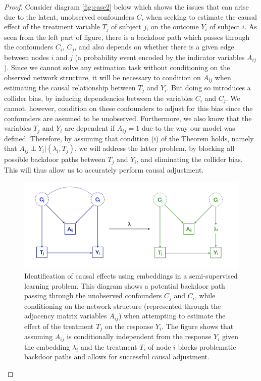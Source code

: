 \documentclass{article}
\begin{document}
\begin{proof}
Consider diagram \ref{fig:case2} below which shows the issues that can arise due to the latent, unobserved confounders $C$, when seeking to estimate the causal effect of the treatment variable $T_j$ of subject $j$, on the outcome $Y_i$ of subject $i$. As seen from the left part of figure, there is a backdoor path which passes through the confounders $C_i$, $C_j$, and also depends on whether there is a given edge between nodes $i$ and $j$ (a probability event encoded by the indicator variables $A_{ij}$). Since we cannot solve any estimation task without conditioning on the observed network structure, it will be necessary to condition on $A_{ij}$ when estimating the causal relationship between $T_j$ and $Y_i$. But doing so introduces a collider bias, by inducing dependencies between the variables $C_i$ and $C_j$. We cannot, however, condition on these confounders to adjust for this bias since the confounders are assumed to be unobserved. Furthermore, we also know that the variables $T_j$ and $Y_i$ are dependent if $A_{ij} =1$ due to the way our model was defined. Therefore, by assuming that condition (i) of the Theorem holds, namely that $A_{ij} \perp Y_i | (\lambda_i, T_j)$, we will address the latter problem, by blocking all possible backdoor paths between $T_j$ and $Y_i$, and eliminating the collider bias. This will thus allow us to accurately perform causal adjustment. 



\begin{figure}
  \includegraphics[width=\linewidth]{case1.png}
  \caption{Identification of causal effects using embeddings in a semi-supervised learning problem. This diagram shows a potential backdoor path passing through the unobserved confounders $C_j$ and $C_i$, while conditioning on the network structure (represented through the adjacency matrix variables $A_{ij}$) when attempting to estimate the effect of the treatment $T_j$ on the response $Y_i$. The figure shows that assuming $A_{ij}$ is conditionally independent from the response $Y_i$ given the embedding $\lambda_i$ and the treatment $T_i$ of node $i$ blocks problematic backdoor paths and allows for successful causal adjustment.}
  \label{fig:case1}
\end{figure}
\end{proof}
\end{document}
